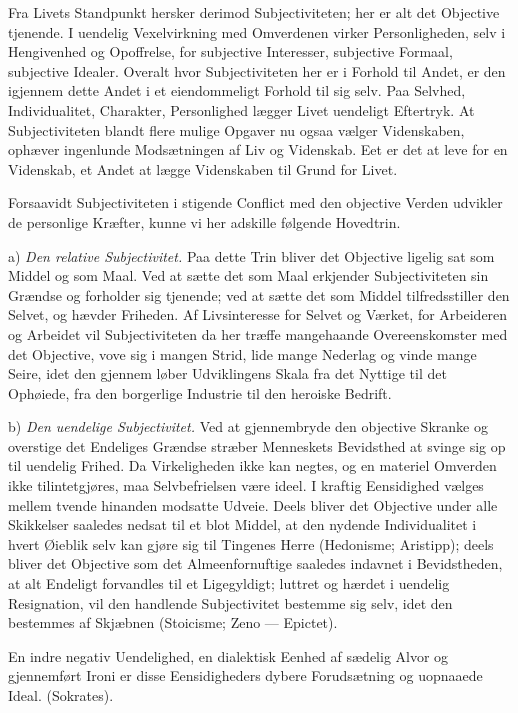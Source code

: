 \documentclass[12pt]{book}
\newcommand{\opage}[1]{\marginnote{\footnotesize\textit{[#1]}}}
\begin{document}
Fra Livets Standpunkt hersker derimod Subjectiviteten; her er alt det Objective
tjenende. I uendelig Vexelvirkning med Omverdenen virker Personligheden, selv i
Hengivenhed og Opoffrelse, for subjective Interesser, subjective Formaal, subjective
Idealer. Overalt hvor Subjectiviteten her er i Forhold til Andet, er den igjennem dette
Andet i et eiendommeligt Forhold til sig selv. Paa Selvhed, Individualitet, Charakter,
Personlighed lægger Livet uendeligt Eftertryk. At Subjectiviteten blandt flere mulige
Opgaver nu ogsaa vælger Videnskaben, ophæver ingenlunde Modsætningen af Liv og
Videnskab. Eet er det at leve for en Videnskab, et Andet at lægge Videnskaben til Grund
for Livet.

Forsaavidt Subjectiviteten i stigende Conflict med den objective Verden udvikler de
personlige Kræfter, kunne vi her adskille følgende Hovedtrin.

a) \emph{Den relative Subjectivitet.} Paa dette Trin bliver det Objective ligelig sat
som Middel og som Maal. Ved at sætte det som Maal erkjender Subjectiviteten sin Grændse
og forholder sig tjenende; ved at sætte det som Middel tilfredsstiller den Selvet, og
hævder Friheden. Af Livsinteresse for Selvet og Værket, for Arbeideren og Arbeidet vil
Subjectiviteten da her træffe mangehaande Overeenskomster med det Objective, vove sig i
mangen Strid, lide mange Nederlag og vinde mange Seire, idet den gjennem%
\opage{76}løber Udviklingens Skala fra det Nyttige til det Ophøiede, fra den borgerlige Industrie
til den heroiske Bedrift.

b) \emph{Den uendelige Subjectivitet.} Ved at gjennembryde den objective Skranke og
overstige det Endeliges Grændse stræber Menneskets Bevidsthed at svinge sig op til
uendelig Frihed. Da Virkeligheden ikke kan negtes, og en materiel Omverden ikke
tilintetgjøres, maa Selvbefrielsen være ideel. I kraftig Eensidighed vælges mellem
tvende hinanden modsatte Udveie. Deels bliver det Objective under alle Skikkelser
saaledes nedsat til et blot Middel, at den nydende Individualitet i hvert Øieblik selv
kan gjøre sig til Tingenes Herre (Hedonisme; Aristipp); deels bliver det Objective som
det Almeenfornuftige saaledes indavnet i Bevidstheden, at alt Endeligt forvandles til
et Ligegyldigt; luttret og hærdet i uendelig Resignation, vil den handlende
Subjectivitet bestemme sig selv, idet den bestemmes af Skjæbnen (Stoicisme; Zeno —
Epictet).

En indre negativ Uendelighed, en dialektisk Eenhed af sædelig Alvor og gjennemført
Ironi er disse Eensidigheders dybere Forudsætning og uopnaaede Ideal. (Sokrates).
\end{document}
